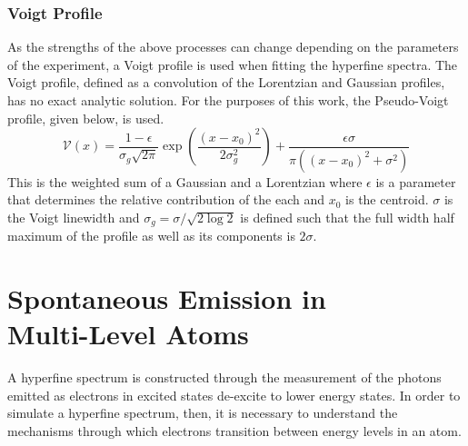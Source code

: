 \subsubsection{Voigt Profile}
As the strengths of the above processes can change depending on the parameters of the experiment, a Voigt profile is used when fitting the hyperfine spectra. The Voigt profile, defined as a convolution of the Lorentzian and Gaussian profiles, has no exact analytic solution. For the purposes of this work, the Pseudo-Voigt profile, given below, is used.
\begin{equation}
\mathcal{V}(x) = \frac{1-\epsilon}{\sigma_g\sqrt{2\pi}}\exp\left(\frac{(x-x_0)^2}{2\sigma_g^2}\right)+\frac{\epsilon\sigma}{\pi((x-x_0)^2+\sigma^2)}
\end{equation}
This is the weighted sum of a Gaussian and a Lorentzian where $\epsilon$ is a parameter that determines the relative contribution of the each and $x_0$ is the centroid. $\sigma$ is the Voigt linewidth and $\sigma_g = \sigma/\sqrt{2\log{2}}$ is defined such that the full width half maximum of the profile as well as its components is $2\sigma$.\cite{voigt}
\section{Spontaneous Emission in \\ Multi-Level Atoms}
\label{ALI}
A hyperfine spectrum is constructed through the measurement of the photons emitted as electrons in excited states de-excite to lower energy states. In order to simulate a hyperfine spectrum, then, it is necessary to understand the mechanisms through which electrons transition between energy levels in an atom.


